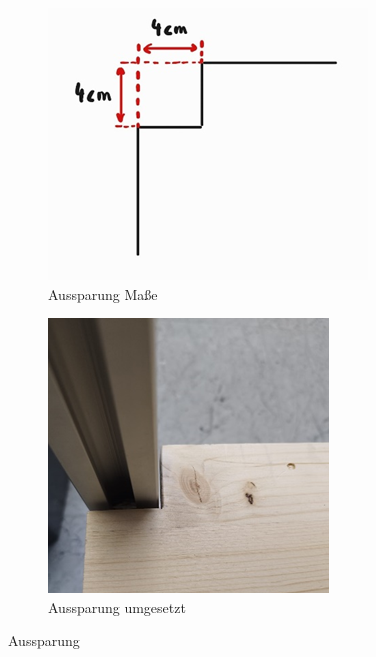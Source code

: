 \begin{figure}[H]
    \centering
    \begin{subfigure}[b]{0.4\textwidth}
        \centering
        \includegraphics[width=\textwidth]{image/Bild1holzplatte.png}
        \caption{Aussparung Maße}
        \label{fig:bild1}
    \end{subfigure}
    \hfill
    \begin{subfigure}[b]{0.35\textwidth}
        \centering
        \includegraphics[width=\textwidth]{image/Bild2holzplatte.png}
        \caption{Aussparung umgesetzt}
        \label{fig:bild2}
    \end{subfigure}
    \caption{Aussparung}
    \label{fig:zwei_bilder}
\end{figure}
